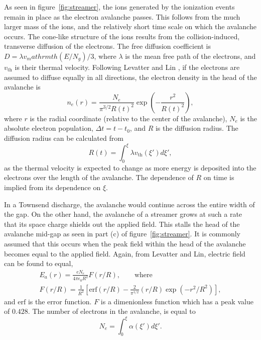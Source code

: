 {As seen in figure~\ref{fig:streamer}, the ions generated by the ionization
events remain in place as the electron avalanche passes. This follows from the
much larger mass of the ions, and the relatively short time scale on which the
avalanche occurs. The cone-like structure of the ions results from the
collision-induced, transverse diffusion of the electrons. The free diffusion
coefficient is $D = \lambda v_mathrm{th}(E/N_g)/3$, where $\lambda$ is the mean
free path of the electrons, and $v_\mathrm{th}$ is their thermal velocity.
Following Levatter and Lin \cite{Levatter1980}, if the electrons are assumed to
diffuse equally in all directions, the electron density in the head of the
avalanche is
\begin{equation}
  n_e(r) = \frac{N_e}{\pi^{3/2}R(t)^2}\exp\left(-\frac{r^2}{R(t)^2}\right),
  \label{eq:s_density}
\end{equation}
where $r$ is the radial coordinate (relative to the center of the avalanche),
$N_e$ is the absolute electron population, $\Delta t = t - t_0$, and $R$ is the
diffusion radius. The diffusion radius can be calculated from
\begin{equation}
  R(t) = \int_{0}^{\xi} \lambda v_\mathrm{th}(\xi') d\xi',
  \label{eq:s_rad}
\end{equation}
as the thermal velocity is expected to change as more energy is deposited into
the electrons over the length of the avalanche. The dependence of $R$ on time is
implied from its dependence on $\xi$.

In a Townsend discharge, the avalanche would continue across the entire width of
the gap. On the other hand, the avalanche of a streamer grows at such a rate
that its space charge shields out the applied field. This stalls the head of the
avalanche mid-gap as seen in part (c) of figure~\ref{fig:streamer}. It is
commonly assumed that this occurs when the peak field within the head of the
avalanche becomes equal to the applied field. Again, from Levatter and Lin,
electric field can be found to equal,
\begin{eqnarray}
  E_a(r) = \frac{eN_e}{4\pi\epsilon_0R^2} F(r/R), \qquad \mathrm{where} \\
  F(r/R) = \frac{1}{R^2}\left[\mathrm{erf}(r/R)-\frac{2}{\pi^{1/2}}
           (r/R)\exp(-r^2/R^2)\right] ,
\end{eqnarray}
and $\mathrm{erf}$ is the error function. $F$ is a dimenionless function which
has a peak value of $0.428$. The number of electrons in the avalanche, is equal
to
\begin{equation}
  N_e = \int_0^\xi \alpha(\xi')d\xi'.
  \label{eq:s_pop}
\end{equation}

}
